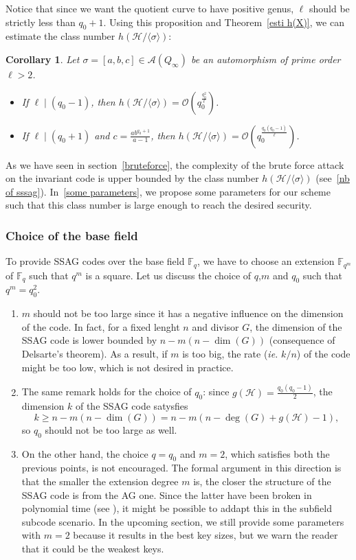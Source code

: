 \documentclass[10pt]{article}
\newtheorem{coro1}[thm]{Corollary}
\theoremstyle{definition}
\theoremstyle{definition}
\theoremstyle{definition}
\newcommand{\calA}{\mathcal{A}}
\newcommand{\calH}{\mathcal{H}}
\newcommand{\calO}{\mathcal{O}}
\newcommand{\fqm}{\mathbb{F}_{q^m}}
\newcommand{\fq}{\mathbb{F}_q}
\begin{document}
Notice that since we want the quotient curve to have positive genus, $\ell$ should be strictly less than $q_0+1$. Using this proposition and Theorem~\ref{esti h(X)}, we can estimate the class number $h(\calH/\langle \sigma \rangle)$:

\begin{coro1} \label{lastcorollary}
Let $\sigma = [a,b,c] \in \calA(Q_{\infty})$ be an automorphism of prime order $\ell > 2$. 
\begin{itemize}
\item[(i)] If $\ell \mid (q_0-1)$, then $h(\calH/\langle \sigma \rangle) = \calO \left(q_0^{\frac{q_0^2}{\ell}}\right)$.
\item[(ii)] If $\ell \mid (q_0+1)$ and $c=\frac{ab^{q_0+1}}{a-1}$, then $h(\calH/\langle \sigma \rangle) = \calO \left(q_0^{\frac{q_0(q_0-1)}{\ell}}\right)$.
\end{itemize}
\end{coro1}


As we have seen in section~\ref{bruteforce}, the complexity of the brute force attack on the invariant code is upper bounded by the class number $h(\calH/\langle \sigma \rangle)$ (see~\eqref{nb of sssag}). In~\ref{some parameters}, we propose some parameters for our scheme such that this class number is large enough to reach the desired security.


\subsubsection{Choice of the base field}


To provide SSAG codes over the base field $\fq$, we have to choose an extension $\fqm$ of $\fq$ such that $q^m$ is a square. Let us discuss the choice of $q$,$m$ and $q_0$ such that $q^m=q_0^2$.

\begin{enumerate}
\item[$\bullet$] $m$ should not be too large since it has a negative influence on the dimension of the code. In fact, for a fixed lenght $n$ and divisor $G$, the dimension of the SSAG code is lower bounded by $n-m(n-\dim(G))$ (consequence of Delsarte's theorem). As a result, if $m$ is too big, the rate (\textit{ie.} $k/n$) of the code might be too low, which is not desired in practice.
\item[$\bullet$] The same remark holds for the choice of $q_0$: since $g(\calH)=\frac{q_0(q_0-1)}{2}$, the dimension $k$ of the SSAG code satysfies 
\[k \geq n-m(n-\dim(G)) = n-m(n- \deg(G) +g(\calH)-1),\]
so $q_0$ should not be too large as well.
\item[$\bullet$] On the other hand, the choice $q=q_0$ and $m=2$, which satisfies both the previous points, is not encouraged. The formal argument in this direction is that the smaller the extension degree $m$ is, the closer the structure of the SSAG code is from the AG one. Since the latter have been broken in polynomial time (see \cite{Cou}), it might be possible to addapt this in the subfield subcode scenario. In the upcoming section, we still provide some parameters with $m=2$ because it results in the best key sizes, but we warn the reader that it could be the weakest keys. 
\end{enumerate}
 
\end{document}
